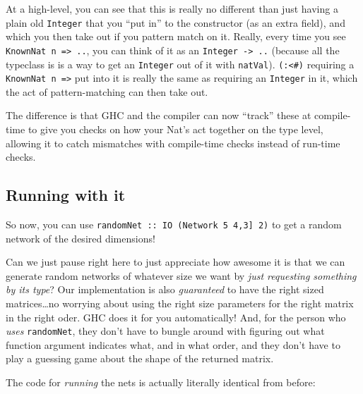 \documentclass[]{article}
\begin{document}
At a high-level, you can see that this is really no different than just
having a plain old \texttt{Integer} that you ``put in'' to the
constructor (as an extra field), and which you then take out if you
pattern match on it. Really, every time you see
\texttt{KnownNat\ n\ =\textgreater{}\ ..}, you can think of it as an
\texttt{Integer\ -\textgreater{}\ ..} (because all the typeclass is is a
way to get an \texttt{Integer} out of it with \texttt{natVal}).
\texttt{(:\textless{}\#)} requiring a
\texttt{KnownNat\ n\ =\textgreater{}} put into it is really the same as
requiring an \texttt{Integer} in it, which the act of pattern-matching
can then take out.

The difference is that GHC and the compiler can now ``track'' these at
compile-time to give you checks on how your Nat's act together on the
type level, allowing it to catch mismatches with compile-time checks
instead of run-time checks.

\subsection{Running with it}\label{running-with-it}

So now, you can use
\texttt{randomNet\ ::\ IO\ (Network\ 5\ \textquotesingle{}{[}4,3{]}\ 2)}
to get a random network of the desired dimensions!

Can we just pause right here to just appreciate how awesome it is that
we can generate random networks of whatever size we want by \emph{just
requesting something by its type}? Our implementation is also
\emph{guaranteed} to have the right sized matrices\ldots{}no worrying
about using the right size parameters for the right matrix in the right
oder. GHC does it for you automatically! And, for the person who
\emph{uses} \texttt{randomNet}, they don't have to bungle around with
figuring out what function argument indicates what, and in what order,
and they don't have to play a guessing game about the shape of the
returned matrix.

The code for \emph{running} the nets is actually literally identical
from before:
\end{document}
